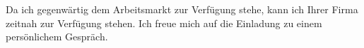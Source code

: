 \documentclass[11pt,a4paper,sans]{moderncv}        %
\begin{document}

Da ich gegenwärtig dem Arbeitsmarkt zur Verfügung stehe, kann ich Ihrer Firma zeitnah zur Verfügung stehen.  Ich freue mich auf die Einladung zu einem persönlichem Gespräch.
\vspace{3mm}

\makeletterclosing
\end{document}
